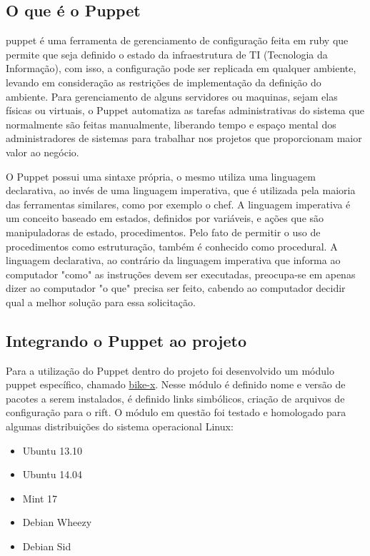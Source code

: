\subsection{O que é o Puppet} %
\label{sub:o_que_o_puppet}

\gls{puppet} é uma ferramenta de gerenciamento de configuração feita em \gls{ruby} que permite que seja definido o estado da infraestrutura de TI (Tecnologia da Informação), com isso, a configuração pode ser replicada em qualquer ambiente, levando em consideração as restrições de implementação da definição do ambiente. Para gerenciamento de alguns servidores ou maquinas, sejam elas físicas ou virtuais, o Puppet automatiza as tarefas administrativas do sistema que normalmente são feitas manualmente, liberando tempo e espaço mental dos administradores de sistemas para trabalhar nos projetos que proporcionam maior valor ao negócio.

O Puppet possui uma sintaxe própria, o mesmo utiliza uma linguagem declarativa, ao invés de uma linguagem imperativa, que é utilizada pela maioria das ferramentas similares, como por exemplo o \gls{chef}. A linguagem imperativa é um conceito baseado em estados, definidos por variáveis, e ações que são manipuladoras de estado, procedimentos. Pelo fato de permitir o uso de procedimentos como estruturação, também é conhecido como procedural. A linguagem declarativa, ao contrário da linguagem imperativa que informa ao computador "como" as instruções devem ser executadas, preocupa-se em apenas dizer ao computador "o que" precisa ser feito, cabendo ao computador decidir qual a melhor solução para essa solicitação.
 

\subsection{Integrando o Puppet ao projeto} %
\label{sub:integrando_o_puppet_ao_projeto}

Para a utilização do Puppet dentro do projeto foi desenvolvido um módulo puppet específico, chamado \href{https://github.com/start-x/startx-src/tree/master/puppet}{bike-x}. Nesse módulo é definido nome e versão de pacotes a serem instalados, é definido links simbólicos, criação de arquivos de configuração para o \gls{rift}. O módulo em questão foi testado e homologado para algumas distribuições do sistema operacional Linux:

\begin{itemize}
\item Ubuntu 13.10
\item Ubuntu 14.04
\item Mint 17
\item Debian Wheezy
\item Debian Sid
\end{itemize}

